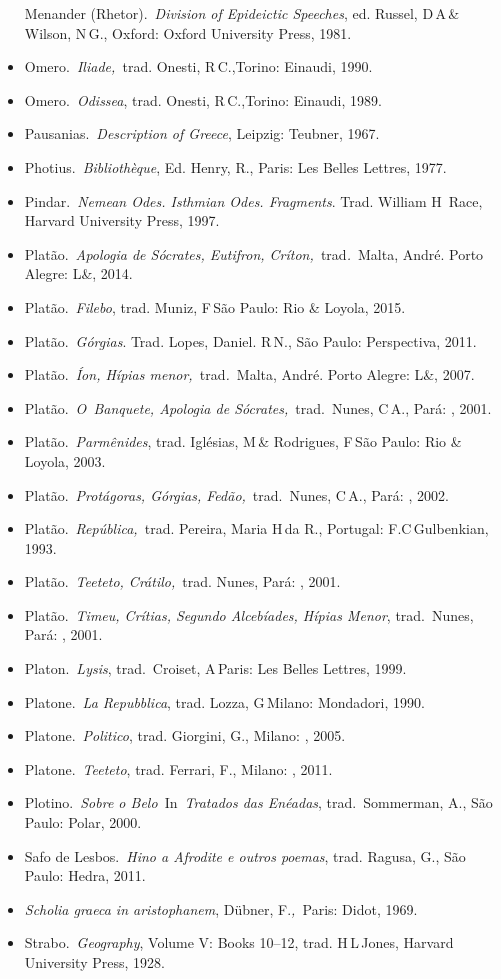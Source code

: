 \begin{itemize}
  Menander (Rhetor).~\emph{Division of Epideictic Speeches}, ed. Russel,
  D\,A\,\& Wilson, N\,G., Oxford: Oxford University Press, 1981.
\item
  Omero.~\emph{Iliade,~}trad. Onesti, R\,C.,Torino: Einaudi, 1990.
\item
  Omero.~\emph{Odissea}, trad. Onesti, R\,C.,Torino: Einaudi, 1989.
\item
  Pausanias.~\emph{Description of Greece}, Leipzig: Teubner, 1967.
\item
  Photius.~\emph{Bibliothèque}, Ed. Henry, R., Paris: Les Belles
  Lettres, 1977.
\item
  Pindar.~\emph{Nemean Odes. Isthmian Odes. Fragments}. Trad. William H\,  Race, Harvard University Press, 1997.
\item
  Platão.~\emph{Apologia de Sócrates, Eutifron,
  Críton,~}trad\emph{.}~Malta, André. Porto Alegre: L\&, 2014.
\item
  Platão.~\emph{Filebo}, trad. Muniz, F\,São Paulo:  Rio \& Loyola,
  2015.
\item
  Platão.~\emph{Górgias}. Trad. Lopes, Daniel. R\,N., São Paulo:
  Perspectiva, 2011.
\item
  Platão.\emph{~Íon, Hípias menor,~}trad\emph{.}~Malta, André. Porto
  Alegre: L\&, 2007.
\item
  Platão.~\emph{O~Banquete, Apologia de Sócrates,}~trad.~Nunes, C\,A.,
  Pará: , 2001.
\item
  Platão.~\emph{Parmênides}, trad. Iglésias, M\,\& Rodrigues, F\,São
  Paulo:  Rio \& Loyola, 2003.
\item
  Platão.~\emph{Protágoras, Górgias, Fedão,}~trad.~Nunes, C\,A., Pará:
  , 2002.
\item
  Platão.~\emph{República,~}trad. Pereira, Maria H\,da R., Portugal:
  F.C\,Gulbenkian, 1993.
\item
  Platão.~\emph{Teeteto, Crátilo,}~trad. Nunes, Pará: , 2001.
\item
  Platão.~\emph{Timeu, Crítias, Segundo Alcebíades, Hípias Menor},
  trad.~Nunes, Pará: , 2001.
\item
  Platon.~\emph{Lysis}, trad.~Croiset, A\,Paris: Les Belles Lettres,
  1999.
\item
  Platone.~\emph{La Repubblica}, trad. Lozza, G\,Milano: Mondadori,
  1990.
\item
  Platone.~\emph{Politico}, trad. Giorgini, G., Milano: , 2005.
\item
  Platone.~\emph{Teeteto}, trad. Ferrari, F., Milano: , 2011.
\item
  Plotino.~\emph{Sobre o Belo~}In~\emph{Tratados das Enéadas},
  trad.~Sommerman, A., São Paulo: Polar, 2000.
\item
  Safo de Lesbos.~\emph{Hino a Afrodite e outros poemas}, trad. Ragusa,
  G., São Paulo: Hedra, 2011.
\item
  \emph{Scholia graeca in aristophanem}, Dübner, F.\emph{,~}Paris:
  Didot, 1969.
\item
  Strabo.~\emph{Geography}, Volume V: Books 10--12, trad. H\,L\,Jones,
  Harvard University Press, 1928.
\end{itemize}

